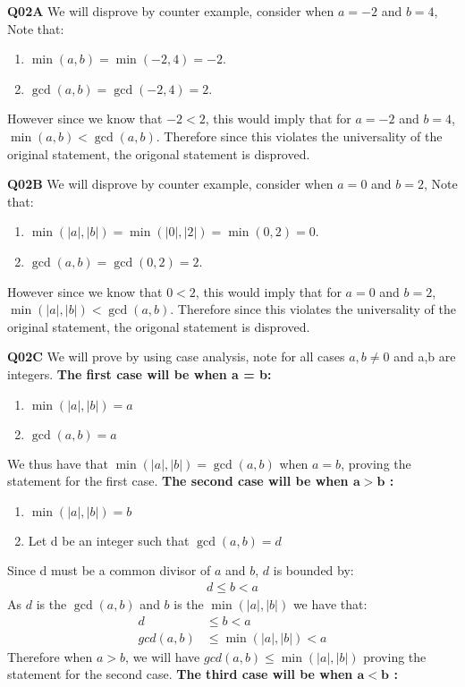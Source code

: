 \documentclass[11pt]{article}
\begin{document}
\textbf{Q02A} We will disprove by counter example, consider when  $a = -2$ and $b= 4$, Note that:
\begin{enumerate}
\item $\min(a, b) = \min(-2,4) = -2$.

\item$\gcd(a, b) = \gcd(-2,4) = 2$.
\end{enumerate}
However since we know that $-2 < 2$, this would imply that for  $a = -2$ and $b= 4$, $\min(a,b) < \gcd(a,b)$. Therefore since this violates the universality of the original statement, the origonal statement is disproved.

\textbf{Q02B} We will disprove by counter example, consider when  $a = 0$ and $b= 2$, Note that:
\begin{enumerate}
\item $\min(|a|, |b|) = \min(|0|,|2|) = \min(0,2) = 0$.

\item$\gcd(a, b) = \gcd(0,2) = 2$.
\end{enumerate}
However since we know that $0 < 2$, this would imply that for  $a = 0$ and $b= 2$, $\min(|a|,|b|) < \gcd(a,b)$. Therefore since this violates the universality of the original statement, the origonal statement is disproved.

\textbf{Q02C} We will prove by using case analysis, note for all cases $a,b \neq 0$ and a,b are integers.
 \textbf{The first case will be when a  = b:}
\begin{enumerate}
\item $\min(|a|, |b|) = a$

\item$\gcd(a, b) = a$
\end{enumerate}
We thus have that $\min(|a|,|b|) = \gcd(a,b)$ when  $a=b$, proving the statement for the first case.
\textbf{The second case will be when $\pmb{a > b}$ :}

\begin{enumerate}
\item $\min(|a|, |b|) = b$

\item Let d be an integer such that $\gcd(a, b) = d$
\end{enumerate}

Since d must be a common divisor of $a$ and $ b$, $d$ is bounded by:
\begin{align*}
d \leq b < a
\end{align*}
As $d$ is the $\gcd(a,b)$ and $b$ is the $\min(|a|,|b|)$ we have that:
\begin{align*}
d &\leq b < a \\
gcd(a,b) &\leq \min(|a|,|b|) < a
\end{align*}
Therefore when $ a > b$, we will have $gcd(a,b) \leq \min(|a|,|b|)$ proving the statement for the second case.
\textbf{The third case will be when $\pmb{a < b}$ :}
\end{document}
